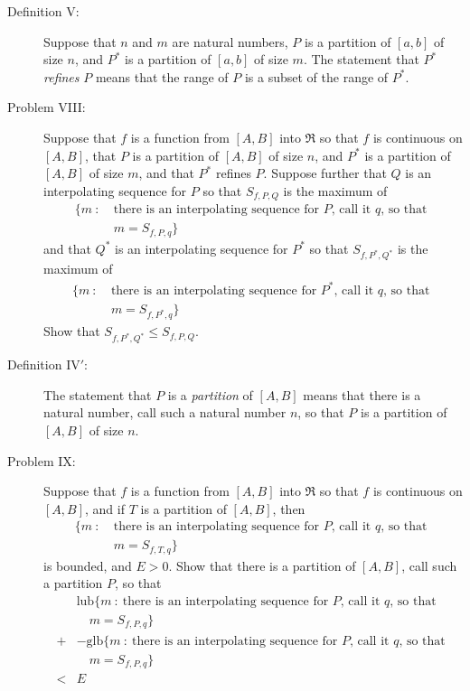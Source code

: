 \documentclass{article}
\begin{document}
\begin{description}
  \item[Definition V:] Suppose that $n$ and $m$ are natural numbers, $P$ is a partition of $[a,b]$ of size $n$, and $P^*$ is a partition of $[a,b]$ of size $m$. The statement that $P^*$ \emph{refines} $P$ means that the range of $P$ is a subset of the range of $P^*$.

  \item[Problem VIII:] Suppose that $f$ is a function from $[A,B]$ into $\Re$ so that $f$ is continuous on $[A,B]$, that $P$ is a partition of $[A,B]$ of size $n$, and $P^*$ is a partition of $[A,B]$ of size $m$, and that $P^*$ refines $P$. Suppose further that $Q$ is an interpolating sequence for $P$ so that $S_{f,P,Q}$ is the maximum of 
    \begin{align*}
    \{ m\ :\ & \text{there is an interpolating sequence for $P$, call it $q$, so that } \\
             & m = S_{f,P,q} \} 
    \end{align*}
    and that $Q^*$ is an interpolating sequence for $P^*$ so that $S_{f,P^*,Q^*}$ is the maximum of 
    \begin{align*}
    \{ m\ :\ & \text{there is an interpolating sequence for $P^*$, call it $q$, so that } \\
             & m = S_{f,P^*,q} \} 
    \end{align*}
    Show that $S_{f,P^*,Q^*} \leq S_{f,P,Q}$.

  \item[Definition IV$'$:] The statement that $P$ is a \emph{partition} of $[A,B]$ means that there is a natural number, call such a natural number $n$, so that $P$ is a partition of $[A,B]$ of size $n$.

  \item[Problem IX:] Suppose that $f$ is a function from $[A,B]$ into $\Re$ so that $f$ is continuous on $[A,B]$, and if $T$ is a partition of $[A,B]$, then 
    \begin{align*}
    \{ m\ :\ & \text{there is an interpolating sequence for $P$, call it $q$, so that } \\
             & m = S_{f,T,q} \} 
    \end{align*}
    is bounded, and $E > 0$. Show that there is a partition of $[A,B]$, call such a partition $P$, so that 
    \begin{align*}
    \ & \text{lub} \{ m\ :\ \text{there is an interpolating sequence for $P$, call it $q$, so that } \\
      & \quad m = S_{f,P,q} \} \\
    + & -\text{glb} \{ m\ :\ \text{there is an interpolating sequence for $P$, call it $q$, so that } \\
      & \quad m = S_{f,P,q} \} \\
    < & E
    \end{align*}


\end{description}
\end{document}
